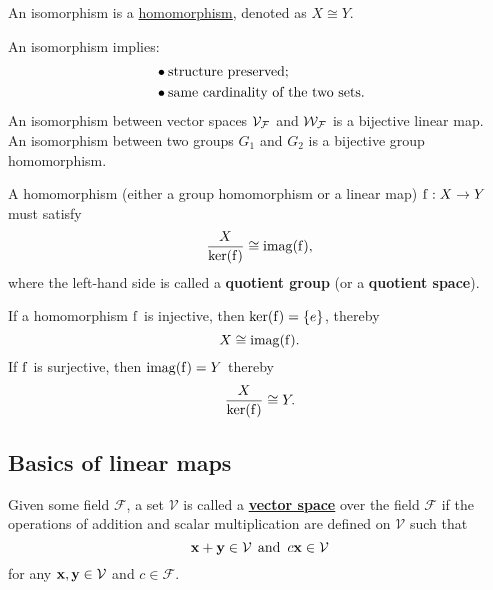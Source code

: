\begin{definition} 
\label{def:isomorphism}
An isomorphism is a 
 \hyperref[def:homomorphism]{homomorphism}, denoted as $X \cong Y$.
\end{definition}
%
\begin{remark}
An isomorphism implies:
\begin{align*}
    &\bullet \textnormal{structure preserved;}\\
    &\bullet \textnormal{same cardinality of the two sets}.
\end{align*}
An isomorphism between vector spaces $\mathcal{V}_{\mathcal{F}}$ and $\mathcal{W}_{\mathcal{F}}$ is a bijective linear map.\\
An isomorphism between two groups $G_1$ and $G_2$ is a bijective group homomorphism.
\end{remark}

\begin{theorem}
A homomorphism (either a group homomorphism or a linear map) $\operatorname{f}: X \to Y$ must satisfy 
$$\frac{X}{\operatorname{ker}(\operatorname{f})} \cong \operatorname{imag}(\operatorname{f}),$$
where the left-hand side is called a \textbf{quotient group} (or a \textbf{quotient space}).
\end{theorem}
%
\begin{corollary}
If a  homomorphism $\operatorname{f}$ is injective, then $\operatorname{ker}(\operatorname{f}) = \{e\}$, thereby
$$X \cong \operatorname{imag}(\operatorname{f}).$$
If $\operatorname{f}$ is surjective, then $\operatorname{imag}(\operatorname{f}) = Y$ thereby
$$\frac{X}{\operatorname{ker}(\operatorname{f})} \cong Y.$$
\end{corollary}



\subsection{Basics of linear maps}

\begin{definition} 
\label{def:vector-space}
Given some field $\mathcal{F}$, a set $\mathcal{V}$ is called a \textbf{\underline{vector space}} over the field $\mathcal{F}$ if the operations of addition and scalar multiplication are defined on $\mathcal{V}$ such that 
$$ \mathbf{x} + \mathbf{y} \in \mathcal{V} \>\> \text{and} \,\,\, c\mathbf{x} \in \mathcal{V}$$
for any $ \mathbf{x}, \mathbf{y} \in \mathcal{V}$ and $c \in \mathcal{F}$. 
\end{definition}

